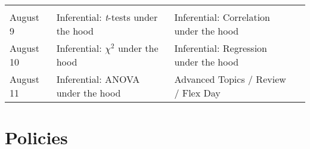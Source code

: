 \documentclass[
]{book}
\begin{document}
\begin{longtable}[]{@{}llll@{}}
\begin{minipage}[t]{0.29\columnwidth}
\strut
\end{minipage} & \begin{minipage}[t]{0.18\columnwidth}\raggedright
\strut
\end{minipage}\tabularnewline
\begin{minipage}[t]{0.09\columnwidth}\raggedright
August 9\strut
\end{minipage} & \begin{minipage}[t]{0.32\columnwidth}\raggedright
Inferential: \emph{t}-tests under the hood\strut
\end{minipage} & \begin{minipage}[t]{0.29\columnwidth}\raggedright
Inferential: Correlation under the hood\strut
\end{minipage} & \begin{minipage}[t]{0.18\columnwidth}\raggedright
\strut
\end{minipage}\tabularnewline
\begin{minipage}[t]{0.09\columnwidth}\raggedright
August 10\strut
\end{minipage} & \begin{minipage}[t]{0.32\columnwidth}\raggedright
Inferential: \(\chi^2\) under the hood\strut
\end{minipage} & \begin{minipage}[t]{0.29\columnwidth}\raggedright
Inferential: Regression under the hood\strut
\end{minipage} & \begin{minipage}[t]{0.18\columnwidth}\raggedright
\strut
\end{minipage}\tabularnewline
\begin{minipage}[t]{0.09\columnwidth}\raggedright
August 11\strut
\end{minipage} & \begin{minipage}[t]{0.32\columnwidth}\raggedright
Inferential: ANOVA under the hood\strut
\end{minipage} & \begin{minipage}[t]{0.29\columnwidth}\raggedright
Advanced Topics / Review / Flex Day\strut
\end{minipage} & \begin{minipage}[t]{0.18\columnwidth}\raggedright
\strut
\end{minipage}\tabularnewline
\bottomrule
\end{longtable}

\hypertarget{policies}{%
\section{Policies}\label{policies}}
\end{document}
